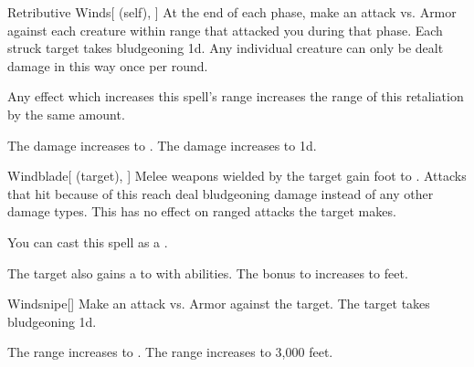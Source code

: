 \lowercase{\hypertarget{spell:Retributive Winds}{}}\label{spell:Retributive Winds}
\begin{attuneability}[Rank 3]{\hypertarget{spell:Retributive Winds}{Retributive Winds}}[ (self), ]
At the end of each phase, make an attack vs. Armor against each creature within \rngclose range that attacked you during that phase.
\hit Each struck target takes bludgeoning  \minus1d.
Any individual creature can only be dealt damage in this way once per round.

Any effect which increases this spell's range increases the range of this retaliation by the same amount.

\rankline
{} The damage increases to .
 The damage increases to  \plus1d.
\end{attuneability}
\vspace{0.25em}



\lowercase{\hypertarget{spell:Windblade}{}}\label{spell:Windblade}
\begin{attuneability}[Rank 3]{\hypertarget{spell:Windblade}{Windblade}}[ (target), ]
Melee weapons wielded by the target gain  foot  to .
Attacks that hit because of this reach deal bludgeoning damage instead of any other damage types.
This has no effect on ranged attacks the target makes.

You can cast this spell as a .

\rankline
{} The target also gains a   to  with  abilities.
 The bonus to  increases to  feet.
\end{attuneability}
\vspace{0.25em}



\lowercase{\hypertarget{spell:Windsnipe}{}}\label{spell:Windsnipe}
\begin{freeability}[Rank 3]{\hypertarget{spell:Windsnipe}{Windsnipe}}[]
Make an attack vs. Armor against the target.
\hit The target takes bludgeoning  \plus1d.

\rankline
{} The range increases to \rngext.
 The range increases to 3,000 feet.
\end{freeability}
\vspace{0.25em}



